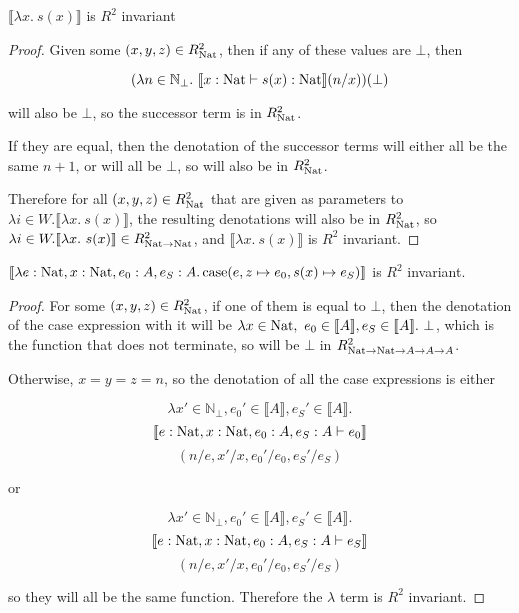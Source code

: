 \begin{lem}
$\llbracket \lambda x . \ s(x) \rrbracket$ is $R^2$ invariant
\end{lem}

\vspace{0.25cm}

\begin{proof}
Given some $(x,y,z) \in R_{\operatorname{Nat}}^2$, then if any of these values are $\bot$, then 

\[(\lambda n \in \mathbb{N}_{\bot}. \ \llbracket x : \nat \vdash s(x) : \nat \rrbracket (n/x))(\bot)\]

will also be $\bot$, so the successor term is in $R_{\operatorname{Nat}}^2$.

If they are equal, then the denotation of the successor terms will either all be the same $n + 1$, or will all be $\bot$, so will also be in $R_{\operatorname{Nat}}^2$.

Therefore for all $(x,y,z) \in R_{\operatorname{Nat}}^2$ that are given as parameters to $\lambda i \in W. \llbracket \lambda x . \ s(x) \rrbracket$, the resulting denotations will also be in $R_{\operatorname{Nat}}^2$, so $\lambda i \in W. \llbracket \lambda x . \ s(x) \rrbracket \in R_{\operatorname{Nat} \to \operatorname{Nat}}^2$, and $\llbracket \lambda x . \ s(x) \rrbracket$ is $R^2$ invariant.
\end{proof}


\vspace{0.5cm}

\begin{lem}
$\llbracket \lambda e : \operatorname{Nat}, x : \operatorname{Nat}, e_0 : A, e_S : A. \operatorname{case} (e, z \mapsto e_0, s(x) \mapsto e_S) \rrbracket$ is $R^2$ invariant.
\end{lem}

\begin{proof} For some $(x,y,z) \in R_{\operatorname{Nat}}^2$, if one of them is equal to $\bot$, then the denotation of the case expression with it will be $\lambda x \in \operatorname{Nat}, \ e_0 \in \llbracket A \rrbracket, e_S \in \llbracket A \rrbracket . \ \bot$, which is the function that does not terminate, so will be $\bot$ in $R_{\operatorname{Nat} \to \operatorname{Nat} \to A \to A \to A}^2$.

Otherwise, $x = y = z = n$, so the denotation of all the case expressions is either 

\[ \lambda x' \in \mathbb{N}_{\bot}, e_0' \in \llbracket A \rrbracket ,  e_S' \in \llbracket A \rrbracket .\] \[\llbracket e : \operatorname{Nat}, x : \operatorname{Nat}, e_0 : A , e_S : A \vdash e_0 \rrbracket\]
\[ (n/e, x'/x, e_0'/e_0, e_S'/e_S)\]

or 

\[ \lambda x' \in \mathbb{N}_{\bot}, e_0' \in \llbracket A \rrbracket ,  e_S' \in \llbracket A \rrbracket .\] \[\llbracket e : \operatorname{Nat}, x : \operatorname{Nat}, e_0 : A , e_S : A \vdash e_S \rrbracket\]
\[ (n/e, x'/x, e_0'/e_0, e_S'/e_S)\]

so they will all be the same function. Therefore the $\lambda$ term is $R^2$ invariant.

\end{proof}

